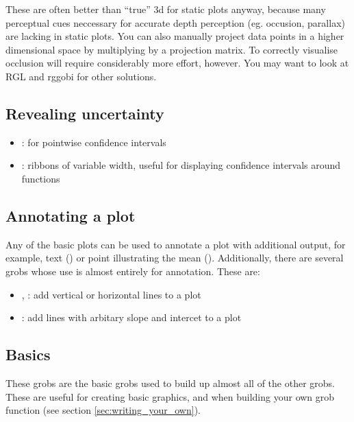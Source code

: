 These are often better than ``true'' 3d for static plots anyway, because many perceptual cues neccessary for accurate depth perception (eg. occusion, parallax) are lacking in static plots.  You can also manually project data points in a higher dimensional space by multiplying by a projection matrix.  To correctly visualise occlusion will require considerably more effort, however.  You may want to look at RGL and rggobi for other solutions.

\subsection{Revealing uncertainty}\label{sub:displaying_uncertainty}

\begin{itemize}
	\item {}: for pointwise confidence intervals
	\item {}: ribbons of variable width, useful for displaying confidence intervals around functions
\end{itemize}

\subsection{Annotating a plot}\label{sub:annotating_a_plot}

Any of the basic plots can be used to annotate a plot with additional output, for example, text () or point illustrating the mean ().  Additionally, there are several grobs whose use is almost entirely for annotation.  These are:

\begin{itemize}
	\item {}, : add vertical or horizontal lines to a plot
	\item {}: add lines with arbitary slope and intercet to a plot
\end{itemize}

\subsection{Basics}\label{sub:basics}

These grobs are the basic grobs used to build up almost all of the other grobs.  These are useful for creating basic graphics, and when building your own grob function (see section \ref{sec:writing_your_own}).

